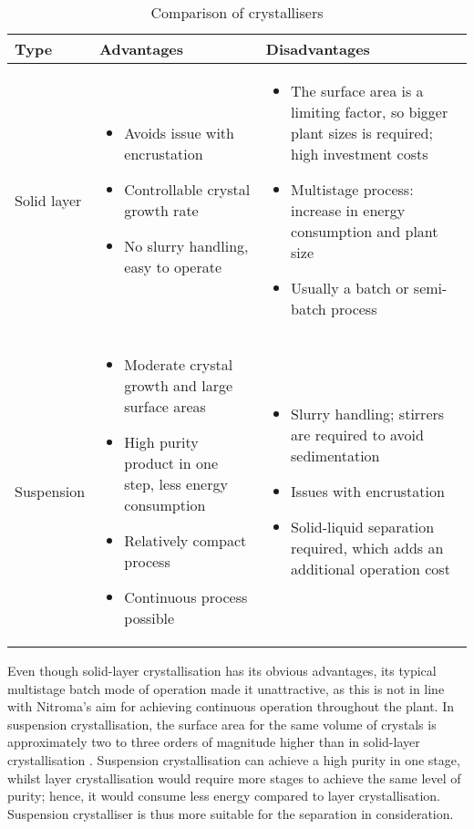 \begin{table}
\caption{Comparison of crystallisers \cite{myerson_handbook_2019} }
\label{tab:crystallisertype}
\begin{tabularx}{\linewidth}{@{}lXX@{}}
\toprule
Type & Advantages                 & Disadvantages                               \\ \midrule
Solid layer & \begin{itemize}[label=+,leftmargin=1em]
  \item Avoids issue with encrustation
  \item Controllable crystal growth rate 
  \item No slurry handling, easy to operate
\end{itemize} & \begin{itemize}[label=-,leftmargin=1em]
  \item The surface area is a limiting factor, so bigger plant sizes is required; high investment costs
  \item Multistage process: increase in energy consumption and plant size 
  \item Usually a batch or semi-batch process
\end{itemize} \\\midrule 
Suspension &  \begin{itemize}[label=+,leftmargin=1em]
  \item Moderate crystal growth and large surface areas 
  \item High purity product in one step, less energy consumption
  \item Relatively compact process
  \item Continuous process possible
\end{itemize} & \begin{itemize}[label=-,leftmargin=1em]
  \item Slurry handling; stirrers are required to avoid sedimentation
  \item Issues with encrustation 
  \item Solid-liquid separation required, which adds an additional operation cost
\end{itemize}
\\\bottomrule
\end{tabularx}
\end{table}

Even though solid-layer crystallisation has its obvious advantages, its typical multistage batch mode of operation made it unattractive, as this is not in line with Nitroma's aim for achieving continuous operation throughout the plant. In suspension crystallisation, the surface area for the same volume of crystals is approximately two to three orders of magnitude higher than in solid-layer crystallisation \cite{noauthor_types_nodate}. Suspension crystallisation can achieve a high purity in one stage, whilst layer crystallisation would require more stages to achieve the same level of purity; hence, it would consume less energy compared to layer crystallisation. Suspension crystalliser is thus more suitable for the separation in consideration. 

